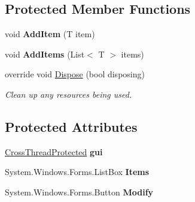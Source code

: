 \subsection*{Protected Member Functions}
\begin{DoxyCompactItemize}
\item 
\hypertarget{classlib_watcher_dialog_1_1_list_1_1_list_dialog_3_01_t_01_4_a3cf729475349ffe79ce01c6ced752d05}{void {\bfseries Add\+Item} (T item)}\label{classlib_watcher_dialog_1_1_list_1_1_list_dialog_3_01_t_01_4_a3cf729475349ffe79ce01c6ced752d05}

\item 
\hypertarget{classlib_watcher_dialog_1_1_list_1_1_list_dialog_3_01_t_01_4_a26a450e514c28bd0d87af49fa39e6897}{void {\bfseries Add\+Items} (List$<$ T $>$ items)}\label{classlib_watcher_dialog_1_1_list_1_1_list_dialog_3_01_t_01_4_a26a450e514c28bd0d87af49fa39e6897}

\item 
override void \hyperlink{classlib_watcher_dialog_1_1_list_1_1_list_dialog_3_01_t_01_4_a0b08aa4fe4da410a3c1716c55f547ce4}{Dispose} (bool disposing)
\begin{DoxyCompactList}\small\item\em Clean up any resources being used. \end{DoxyCompactList}\end{DoxyCompactItemize}
\subsection*{Protected Attributes}
\begin{DoxyCompactItemize}
\item 
\hypertarget{classlib_watcher_dialog_1_1_list_1_1_list_dialog_3_01_t_01_4_afa0caeb54f857a60dd39198d3b4a9d49}{\hyperlink{class_dialog_1_1_cross_thread_protected}{Cross\+Thread\+Protected} {\bfseries gui}}\label{classlib_watcher_dialog_1_1_list_1_1_list_dialog_3_01_t_01_4_afa0caeb54f857a60dd39198d3b4a9d49}

\item 
\hypertarget{classlib_watcher_dialog_1_1_list_1_1_list_dialog_3_01_t_01_4_ab4bbfef8a08f358dfbd6efe38df3d629}{System.\+Windows.\+Forms.\+List\+Box {\bfseries Items}}\label{classlib_watcher_dialog_1_1_list_1_1_list_dialog_3_01_t_01_4_ab4bbfef8a08f358dfbd6efe38df3d629}

\item 
\hypertarget{classlib_watcher_dialog_1_1_list_1_1_list_dialog_3_01_t_01_4_a8dde957cd54b9d3f671fdf5eb6ff6a6e}{System.\+Windows.\+Forms.\+Button {\bfseries Modify}}\label{classlib_watcher_dialog_1_1_list_1_1_list_dialog_3_01_t_01_4_a8dde957cd54b9d3f671fdf5eb6ff6a6e}

\end{DoxyCompactItemize}
